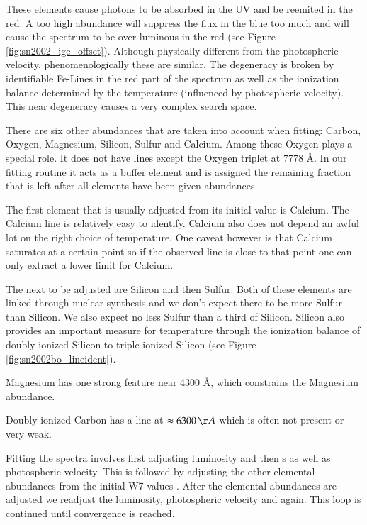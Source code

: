 These elements cause photons to be absorbed in the UV and be reemited in the red. A too high abundance will suppress the flux in the blue too much and will cause the spectrum to be over-luminous in the red (see Figure \ref{fig:sn2002_ige_offset}). Although physically different from the photospheric velocity, phenomenologically these are similar. 
The degeneracy is broken by identifiable Fe-Lines in the red part of the spectrum as well as the ionization balance determined by the temperature (influenced by photospheric velocity). 
This near degeneracy causes a very complex search space. 

There are six other abundances that are taken into account when fitting: Carbon, Oxygen, Magnesium, Silicon, Sulfur and Calcium. Among these Oxygen plays a special role. It does not have lines except the Oxygen triplet at 7778 \AA. In our fitting routine it acts as a buffer element and is assigned the remaining fraction that is left after all elements have been given abundances. 

The first element that is usually adjusted from its initial value is Calcium. The Calcium line is relatively easy to identify. Calcium also does not depend an awful lot on the right choice of temperature. One caveat however is that Calcium saturates at a certain point so if the observed line is close to that point one can only extract a lower limit for Calcium.

The next to be adjusted are Silicon and then Sulfur. Both of these elements are linked through nuclear synthesis and we don't expect there to be more Sulfur than Silicon. We also expect no less Sulfur than a third of Silicon. Silicon also provides an important measure for temperature through the ionization balance of doubly ionized Silicon to triple ionized Silicon (see Figure \ref{fig:sn2002bo_lineident}).


Magnesium has one strong feature near 4300 \AA, which constrains the Magnesium abundance. 

Doubly ionized Carbon has a line at $\approx 6300\,\AA$ which is often not present or very weak. 

Fitting the spectra involves first adjusting luminosity and then \ige s as well as photospheric velocity. This is followed by adjusting the other elemental abundances from the initial W7 values \citep{1984ApJ...286..644N}. After the elemental abundances are adjusted we readjust the luminosity, photospheric velocity and \ige again. This loop is continued until convergence is reached. 

